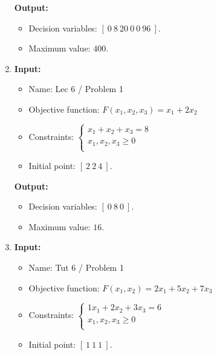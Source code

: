 \documentclass{article}
\begin{document}
\begin{enumerate}[label={(\arabic*)}, itemsep=0.25in]
          \textbf{Output:}
          \begin{itemize}
              \item Decision variables: \([ \ 0 \ 8 \ 20 \ 0 \ 0 \ 96 \ ]\).
              \item Maximum value: \(400\).
          \end{itemize}

    \item \textbf{Input:}
          \begin{itemize}
              \item Name: Lec 6 / Problem 1
              \item Objective function: \(F(x_1, x_2, x_3) =  x_1 + 2 x_2\)
              \item Constraints: \(\begin{cases}
                        x_1 + x_2 + x_3 = 8 \\
                        x_1, x_2, x_3 \ge 0 \\
                    \end{cases}\)
                    \item Initial point: \([ \ 2 \ 2 \ 4 \ ]\).
          \end{itemize}

          \textbf{Output:}
          \begin{itemize}
              \item Decision variables: \([ \ 0 \ 8 \ 0 \ ]\).
              \item Maximum value: \(16\).
          \end{itemize}

    \item \textbf{Input:}
          \begin{itemize}
              \item Name: Tut 6 / Problem 1
              \item Objective function: \(F(x_1, x_2) = 2 x_1 + 5 x_2 + 7 x_3\)
              \item Constraints: \(\begin{cases}
                        1 x_1 + 2 x_2 + 3 x_3 = 6 \\
                        x_1, x_2, x_3 \ge 0       \\
                    \end{cases}\)
                    \item Initial point: \([ \ 1 \ 1 \ 1 \ ]\).
          \end{itemize}


\end{enumerate}
\end{document}
